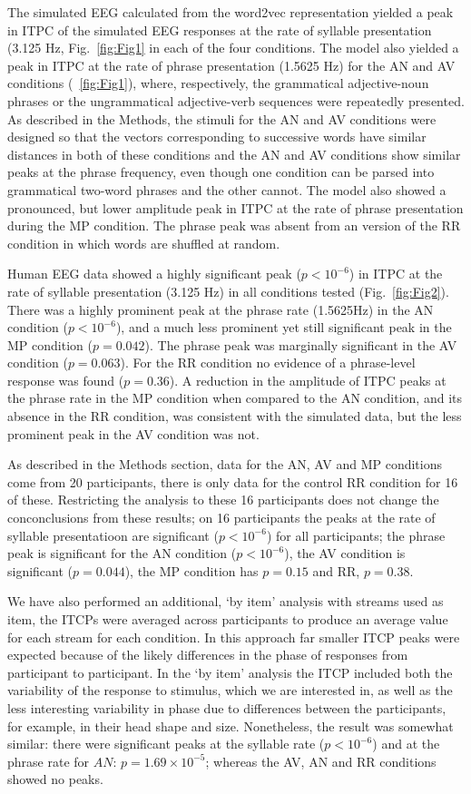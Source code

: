 \documentclass[10pt,letterpaper]{article}
\begin{document}
The simulated EEG calculated from the word2vec representation yielded
a peak in ITPC of the simulated EEG responses at the rate of syllable
presentation (3.125 Hz, Fig.~\ref{fig:Fig1} in each of the four
conditions. The model also yielded a peak in ITPC at the rate of
phrase presentation (1.5625 Hz) for the AN and AV conditions
(~\ref{fig:Fig1}), where, respectively, the grammatical adjective-noun
phrases or the ungrammatical adjective-verb sequences were repeatedly
presented. As described in the Methods, the stimuli for the AN and AV
conditions were designed so that the vectors corresponding to
successive words have similar distances in both of these conditions
and the AN and AV conditions show similar peaks at the phrase
frequency, even though one condition can be parsed into grammatical
two-word phrases and the other cannot. The model also showed a
pronounced, but lower amplitude peak in ITPC at the rate of phrase
presentation during the MP condition. The phrase peak was absent from
an version of the RR condition in which words are shuffled at random.

Human EEG data showed a highly significant peak ($p<10^{-6}$) in ITPC
at the rate of syllable presentation (3.125 Hz) in all conditions
tested (Fig.~\ref{fig:Fig2}). There was a highly prominent peak at the
phrase rate (1.5625Hz) in the AN condition ($p<10^{-6}$), and a much
less prominent yet still significant peak in the MP condition
($p=0.042$). The phrase peak was marginally significant in the AV
condition ($p=0.063$). For the RR condition no evidence of a
phrase-level response was found ($p=0.36$). A reduction in the
amplitude of ITPC peaks at the phrase rate in the MP condition when
compared to the AN condition, and its absence in the RR condition, was
consistent with the simulated data, but the less prominent peak in the
AV condition was not.

As described in the Methods section, data for the AN, AV and MP
conditions come from 20 participants, there is only data for the
control RR condition for 16 of these. Restricting the analysis to
these 16 participants does not change the conconclusions from these
results; on 16 participants the peaks at the rate of syllable
presentatioon are significant ($p<10^{-6}$) for all participants; the
phrase peak is significant for the AN condition ($p<10^{-6}$), the AV
condition is significant ($p=0.044$), the MP condition has $p=0.15$
and RR, $p=0.38$.

We have also performed an additional, `by item' analysis with streams
used as item, the ITCPs were averaged across participants to produce
an average value for each stream for each condition. In this approach
far smaller ITCP peaks were expected because of the likely differences
in the phase of responses from participant to participant. In the `by
item' analysis the ITCP included both the variability of the response
to stimulus, which we are interested in, as well as the less
interesting variability in phase due to differences between the
participants, for example, in their head shape and size. Nonetheless,
the result was somewhat similar: there were significant peaks at the
syllable rate ($p<10^{-6}$) and at the phrase rate for $AN$:
$p=1.69\times 10^{-5}$; whereas the AV, AN and RR conditions showed no
peaks.
\end{document}
